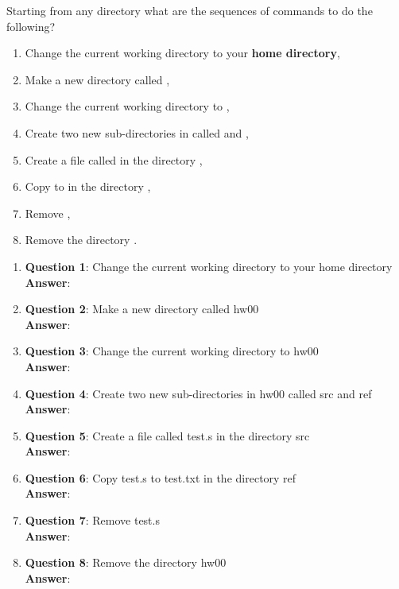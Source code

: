 \item[\textbf{Problem 1}]
Starting from any directory what are the sequences of commands to do the
following?
\begin{enumerate}[label=(\arabic*)]
    \item Change the current working directory to your \textbf{home directory},
    \item Make a new directory called ,
    \item Change the current working directory to ,
    \item Create two new sub-directories in  called  and
          ,
    \item Create a file called  in the directory ,
    \item Copy  to  in the directory ,
    \item Remove ,
    \item Remove the directory .
\end{enumerate}

\Solution

\begin{enumerate}[label=(\arabic*)]
    \item \textbf{Question 1}: Change the current working directory to your home
          directory
          \\
          \textbf{Answer}: 

    \item \textbf{Question 2}: Make a new directory called hw00
          \\
          \textbf{Answer}: 

    \item \textbf{Question 3}: Change the current working directory to hw00
          \\
          \textbf{Answer}: 

    \item \textbf{Question 4}: Create two new sub-directories in hw00 called src
          and ref
          \\
          \textbf{Answer}: 

    \item \textbf{Question 5}: Create a file called test.s in the directory src
          \\
          \textbf{Answer}: 
          
    \item \textbf{Question 6}: Copy test.s to test.txt in the directory ref
          \\
          \textbf{Answer}: 

    \item \textbf{Question 7}: Remove test.s
          \\
          \textbf{Answer}: 
    
    \item \textbf{Question 8}: Remove the directory hw00
          \\
          \textbf{Answer}: 
\end{enumerate}
